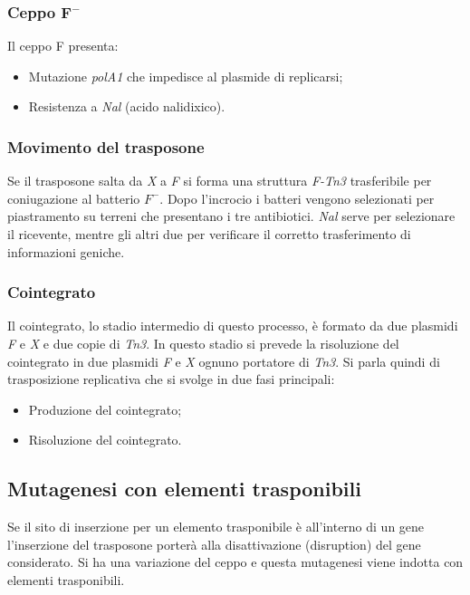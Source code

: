 		\subsubsection{Ceppo \emph{$\mathbf{F^-}$}}
		Il ceppo F\ap{-} presenta:
		\begin{multicols}{2}
			\begin{itemize}
    				\item Mutazione \emph{polA1} che impedisce al plasmide di replicarsi; 
    				\item Resistenza a \emph{Nal} (acido nalidixico).
			\end{itemize}
		\end{multicols}

		\subsubsection{Movimento del trasposone}
		Se il trasposone salta da \emph{X} a \emph{F} si forma una struttura \emph{F-Tn3} trasferibile per coniugazione al batterio \emph{$F^-$}. 
		Dopo l'incrocio i batteri vengono selezionati per piastramento su terreni che presentano i tre antibiotici. 
		\emph{Nal} serve per selezionare il ricevente, mentre gli altri due per verificare il corretto trasferimento di informazioni geniche. 

		\subsubsection{Cointegrato}
		Il cointegrato, lo stadio intermedio di questo processo, è formato da due plasmidi \emph{F} e \emph{X} e due copie di \emph{Tn3}.
		In questo stadio si prevede la risoluzione del cointegrato in due plasmidi \emph{F} e \emph{X} ognuno portatore di \emph{Tn3}.
		Si parla quindi di trasposizione replicativa che si svolge in due fasi principali:
		\begin{multicols}{2}
			\begin{itemize}
    				\item Produzione del cointegrato; 
    				\item Risoluzione del cointegrato.
			\end{itemize}
		\end{multicols}
		
	\subsection{Mutagenesi con elementi trasponibili}
	Se il sito di inserzione per un elemento trasponibile è all'interno di un gene l'inserzione del trasposone porterà alla disattivazione (disruption) del gene considerato. 
	Si ha una variazione del ceppo e questa mutagenesi viene indotta con elementi trasponibili. 

